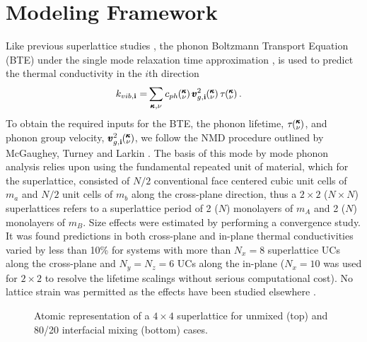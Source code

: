 \documentclass[aps,prb,preprint,preprintnumbers,amsmath,amssymb,floatfix,superscriptaddress]{revtex4}
\newcommand{\kv}{\mspace{-4.0mu}\left(\mspace{-8.0mu}
\begin{smallmatrix}&\pmb{\kappa} \\&\nu\end{smallmatrix}
\mspace{-3.0mu}\right)}
\begin{document}
\section{Modeling Framework}
Like previous superlattice studies \cite{Luckyanova16112012,doi:10.1021/nl202186y}, the phonon Boltzmann Transport Equation (BTE) under the single mode relaxation time approximation \cite{ziman_electrons_2001}, is used to predict the thermal conductivity in the $i$th direction
\begin{equation}\label{EQ:M:conductivity}
\begin{split}
k_{vib,\mathbf{i}}=&\sum_{\pmb{\kappa},\nu} c_{ph}\kv
\pmb{v}^{2}_{g,\mathbf{i}}\kv \tau\kv.
\end{split}
\end{equation}
To obtain the required inputs for the BTE, the phonon lifetime, $\tau\kv$, and phonon group velocity, $\pmb{v}^{2}_{g,\mathbf{i}}\kv$, we follow the NMD procedure outlined by McGaughey\cite{PhysRevB.71.184305}, Turney \cite {PhysRevB.81.081411} and Larkin \cite{jason_inpress}. The basis of this mode by mode phonon analysis relies upon using the fundamental repeated unit of material, which for the superlattice, consisted of $N/2$ conventional face centered cubic unit cells of $m_a$ and $N/2$ unit cells of $m_b$ along the cross-plane direction, thus a $2\times2$ ($N\times N$) superlattices refers to a superlattice period of 2 ($N$) monolayers of $m_A$ and 2 ($N$) monolayers of $m_B$. Size effects were estimated by performing a convergence study. It was found predictions in both cross-plane and in-plane thermal conductivities varied by less than 10\% for systems with more than $N_x=8$ superlattice UCs along the cross-plane and $N_y=N_z=6$ UCs along the in-plane ($N_x=10$ was used for $2\times2$ to resolve the lifetime scalings without serious computational cost). No lattice strain was permitted as the effects have been studied elsewhere \cite{PhysRevB.72.174302}. 

\begin{figure*}[ht!]
\begin{center}
\renewcommand{\figure}{Fig.}
\caption{Atomic representation of a $4\times4$ superlattice for unmixed (top) and 80/20 interfacial mixing (bottom) cases.}
\label{fig:md_domain}
\end{center}
\end{figure*}
\end{document}

